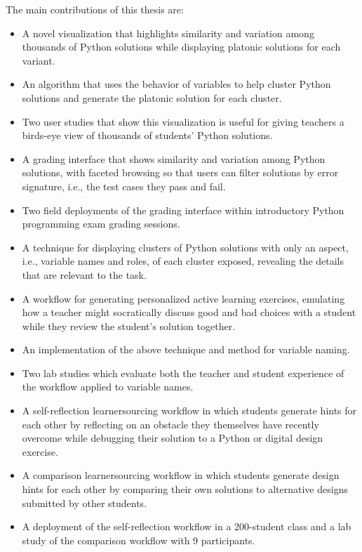The main contributions of this thesis are:
\begin{itemize}
\item A novel visualization that highlights similarity and variation among thousands of Python solutions while displaying platonic solutions for each variant. 
\item An algorithm that uses the behavior of variables to help cluster Python solutions and generate the platonic solution for each cluster.
\item Two user studies that show this visualization is useful for giving teachers a birds-eye view of thousands of students' Python solutions.
\item A grading interface that shows similarity and variation among Python solutions, with faceted browsing so that users can filter solutions by error signature, i.e., the test cases they pass and fail. 
\item Two field deployments of the grading interface within introductory Python programming exam grading sessions.
\item A technique for displaying clusters of Python solutions with only an aspect, i.e., variable names and roles, of each cluster exposed, revealing the details that are relevant to the task. %
\item A workflow for generating personalized active learning exercises, emulating how a teacher might socratically discuss good and bad choices with a student while they review the student's solution together. 
\item An implementation of the above technique and method for variable naming. %
\item Two lab studies which evaluate both the teacher and student experience of the workflow applied to variable names.
\item A self-reflection learnersourcing workflow in which students generate hints for each other by reflecting on an obstacle they themselves have recently overcome while debugging their solution to a Python or digital design exercise.
\item A comparison learnersourcing workflow in which students generate design hints for each other by comparing their own solutions to alternative designs submitted by other students.
\item A deployment of the self-reflection workflow in a 200-student class and a lab study of the comparison workflow with 9 participants.
\end{itemize}

